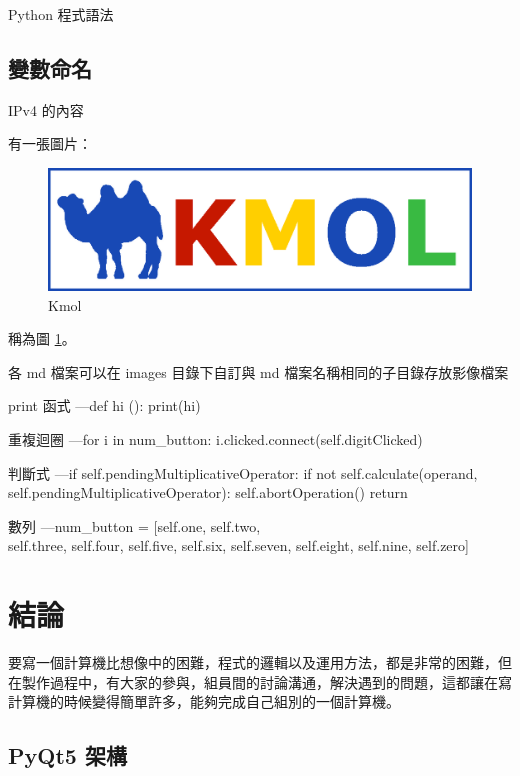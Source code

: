 \documentclass[12pt,,]{report}
\begin{document}
Python 程式語法

\hypertarget{ux8b8aux6578ux547dux540d}{%
\section{變數命名}\label{ux8b8aux6578ux547dux540d}}

IPv4 的內容

有一張圖片：

\begin{figure}
\centering
\includegraphics{./tex2pdf.8180/e0ef408d9559203849a0aa26f79f9b032b709c7a.png}
\caption{Kmol\label{fig:駱駝}}
\end{figure}

稱為圖 \ref{fig:駱駝}。

各 md 檔案可以在 images 目錄下自訂與 md 檔案名稱相同的子目錄存放影像檔案

print 函式 ---def hi (): print(hi)

重複迴圈 ---for i in num\_button: i.clicked.connect(self.digitClicked)

判斷式 ---if self.pendingMultiplicativeOperator: if not
self.calculate(operand, self.pendingMultiplicativeOperator):
self.abortOperation() return

數列 ---num\_button = {[}self.one, self.two,\\
self.three, self.four, self.five, self.six, self.seven, self.eight,
self.nine, self.zero{]}

\hypertarget{ux7d50ux8ad6}{%
\chapter{結論}\label{ux7d50ux8ad6}}

要寫一個計算機比想像中的困難，程式的邏輯以及運用方法，都是非常的困難，但在製作過程中，有大家的參與，組員間的討論溝通，解決遇到的問題，這都讓在寫計算機的時候變得簡單許多，能夠完成自己組別的一個計算機。

\hypertarget{pyqt5-ux67b6ux69cb}{%
\section{PyQt5 架構}\label{pyqt5-ux67b6ux69cb}}
\end{document}
